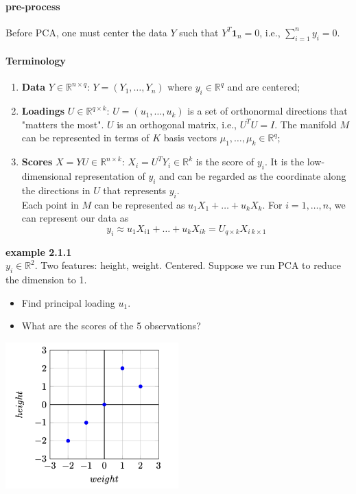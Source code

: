 \documentclass[12pt]{book}
\theoremstyle{definition}
\theoremstyle{remark}
\newcommand{\R}{\mathbb{R}}
\begin{document}
\paragraph{pre-process}
Before PCA, one must center the data $Y$ such that $Y^T\mathbf{1}_n = 0$, i.e., $\sum_{i=1}^ny_i = 0$.
\paragraph{Terminology}
\begin{enumerate}
    \item \textbf{Data} $Y\in\R^{n\times q}$: $Y = (Y_1,\dots, Y_n)$ where $y_i\in \R^q$ and are centered;
    \item \textbf{Loadings} $U \in \R^{q\times k}$: $U = (u_1, \dots, u_k)$ is a set of orthonormal directions that "matters the most". $U$ is an orthogonal matrix, i.e., $U^TU = I$. The manifold $M$ can be represented in terms of $K$ basis vectors $\mu_1, \dots, \mu_k \in \R^q$;
    \item \textbf{Scores} $X = YU \in \R^{n\times k}$: $X_i = U^TY_i\in \R^k$ is the score of $y_i$. It is the low-dimensional representation of $y_i$ and can be regarded as the coordinate along the directions in $U$ that represents $y_i$. \\Each point in $M$ can be represented as $u_1X_1+\dots+u_kX_k$. For $i=1,\dots, n$, we can represent our data as 
    \[y_i \approx u_1X_{i1}+\dots+u_kX_{ik} = U_{q\times k}X_{i \ k \times 1}\]
\end{enumerate}

\textbf{example 2.1.1}\\

$ y_i \in \mathbb{R}^2 $. Two features: height, weight. Centered. Suppose we run PCA to reduce the dimension to 1.
\begin{itemize}
    \item Find principal loading $ u_1 $.
    \item What are the scores of the 5 observations?
\end{itemize}

\begin{center}
    \includegraphics[width=0.5\textwidth]{601-2-1-1.png}
\end{center}
\end{document}
